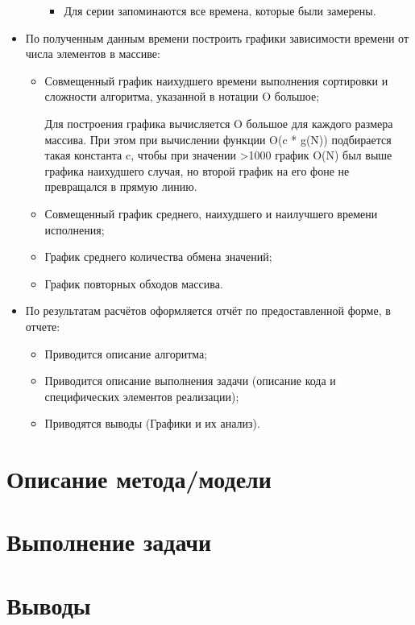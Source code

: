 \documentclass[12pt, a4paper]{report}
\begin{document}
\begin{itemize}
\begin{itemize}
\begin{itemize}
				\item Для серии запоминаются все времена, которые были замерены.
			\end{itemize}
		\end{itemize}
		\item По полученным данным времени построить графики зависимости времени от числа элементов в массиве:
		\begin{itemize}
			\item Совмещенный график наихудшего времени выполнения сортировки и сложности алгоритма, указанной в нотации O большое; \par
			Для построения графика вычисляется O большое для каждого размера массива. При этом при вычислении функции O(c * g(N)) подбирается такая константа c, чтобы при значении >1000 график O(N) был выше графика наихудшего случая, но второй график на его фоне не превращался в прямую линию.
			\item Совмещенный график среднего, наихудшего и наилучшего времени исполнения;
			\item График среднего количества обмена значений;
			\item График повторных обходов массива.
		\end{itemize}
		\item По результатам расчётов оформляется отчёт по предоставленной форме, в отчете:
		\begin{itemize}
			\item Приводится описание алгоритма;
			\item Приводится описание выполнения задачи (описание кода и специфических элементов реализации);
			\item Приводятся выводы (Графики и их анализ).
		\end{itemize}
	\end{itemize}

	\section*{Описание метода/модели}
	
	\section*{Выполнение задачи}

	\section*{Выводы}
		
\end{document}

